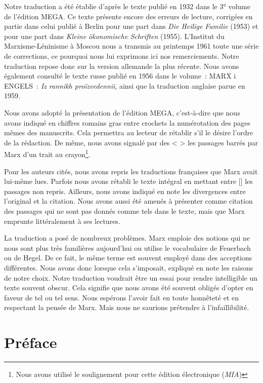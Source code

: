 \documentclass[french,twoside]{book} %
\newcommand{\byline}[1]{\bigskip{\RaggedLeft{#1}\par}\bigskip}
\begin{document}
\noindent Notre traduction a été établie d’après le texte publié en 1932 dans le 3° volume de l’édition MEGA. Ce texte présente encore des erreurs de lecture, corrigées en partie dans celui publié à Berlin pour une part dans \emph{Die Heilige Familie} (1953) et pour une part dans \emph{Kleine ökonomische Schriften} (1955). L’Institut du Marxisme-Léninisme à Moscou nous a transmis au printemps 1961 toute une série de corrections, ce pourquoi nous lui exprimons ici nos remerciements. Notre traduction repose donc sur la version allemande la plus récente. Nous avons également consulté le texte russe publié en 1956 dans le volume : MARX i ENGELS : \emph{Iz rannikh proïzvedennii}, ainsi que la traduction anglaise parue en 1959.\par
Nous avons adopté la présentation de l’édition MEGA, c’est-à-dire que nous avons indiqué en chiffres romains gras entre crochets la numérotation des pages mêmes des manuscrits. Cela permettra au lecteur de rétablir s’il le désire l’ordre de la rédaction. De même, nous avons signalé par des < > les passages barrés par Marx d’un trait au crayon\footnote{Nous avons utilisé le soulignement pour cette édition électronique (\emph{MIA})}.\par
Pour les auteurs cités, nous avons repris les traductions françaises que Marx avait lui-même lues. Parfois nous avons rétabli le texte intégral en mettant entre [] les passages non repris. Ailleurs, nous avons indiqué en note les divergences entre l’original et la citation. Nous avons aussi été amenés à présenter comme citation des passages qui ne sont pas donnés comme tels dans le texte, mais que Marx emprunte littéralement à ses lectures.\par
La traduction a posé de nombreux problèmes. Marx emploie des notions qui ne nous sont plus très familières aujourd’hui ou utilise le vocabulaire de Feuerbach ou de Hegel. De ce fait, le même terme est souvent employé dans des acceptions différentes. Nous avons donc lorsque cela s’imposait, expliqué en note les raisons de notre choix. Notre traduction voudrait être un essai pour rendre intelligible un texte souvent obscur. Cela signifie que nous avons été souvent obligés d’opter en faveur de tel ou tel sens. Nous espérons l’avoir fait en toute honnêteté et en respectant la pensée de Marx. Mais nous ne saurions prétendre à l’infaillibilité.\par

\byline{E. B.}
\mainmatter \section[{Préface}]{Préface}\renewcommand{\leftmark}{Préface}
\end{document}
